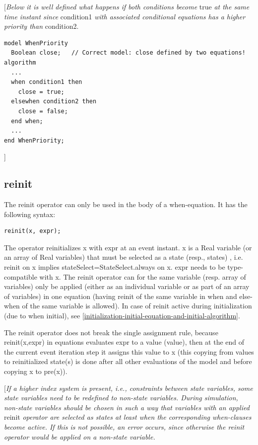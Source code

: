 \documentclass[10pt,a4paper]{report}
\def\doublelabel#1{\label{#1}\hypertarget{#1}{}}
\begin{document}
{[}\emph{Below it is well defined what happens if both conditions
become} true \emph{at the same time instant since} condition1 \emph{with
associated conditional equations has a higher priority than} condition2.

\begin{lstlisting}[language=modelica]
model WhenPriority   
  Boolean close;   // Correct model: close defined by two equations! 
algorithm   
  ...   
  when condition1 then
    close = true;
  elsewhen condition2 then
    close = false;
  end when;   
  ... 
end WhenPriority; 
\end{lstlisting}

{]}

\subsection{reinit}\doublelabel{reinit}

The reinit operator can only be used in the body of a when-equation. It
has the following syntax:

\begin{lstlisting}[language=modelica]
reinit(x, expr);
\end{lstlisting}

The operator reinitializes x with expr at an event instant. x is a Real
variable (or an array of Real variables) that must be selected as a
state (resp., states) , i.e. reinit on x implies
stateSelect=StateSelect.always on x. expr needs to be type-compatible
with x. The reinit operator can for the same variable (resp. array of
variables) only be applied (either as an individual variable or as part
of an array of variables) in one equation (having reinit of the same
variable in when and else-when of the same variable is allowed). In case
of reinit active during initialization (due to when initial), see
\ref{initialization-initial-equation-and-initial-algorithm}.

The reinit operator does not break the single assignment rule, because
reinit(x,expr) in equations evaluates expr to a value (value), then at
the end of the current event iteration step it assigns this value to x
(this copying from values to reinitialized state(s) is done after all
other evaluations of the model and before copying x to pre(x)).

{[}\emph{If a higher index system is present, i.e., constraints between
state variables, some state variables need to be redefined to non-state
variables. During simulation, non-state variables should be chosen in
such a way that variables with an applied} reinit \emph{operator are
selected as states at least when the corresponding when-clauses become
active. If this is not possible, an error occurs, since otherwise the
reinit operator would be applied on a non-state variable.}
\end{document}
